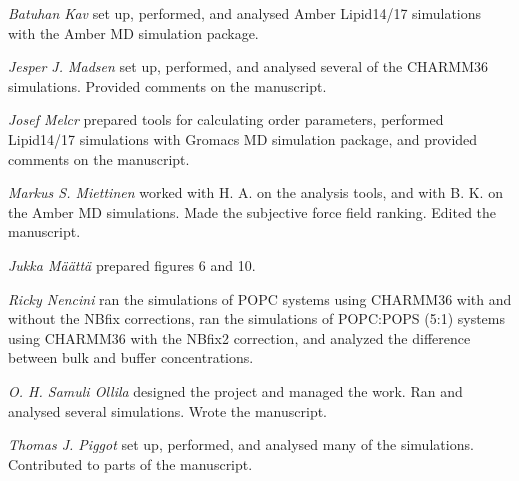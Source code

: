 \documentclass[journal=jpcbfk,manuscript=article]{achemso}
\begin{document}
\noindent
{\it Batuhan Kav}
set up, performed, and analysed Amber Lipid14/17 simulations with the Amber MD simulation package.

\noindent
{\it Jesper J. Madsen}
set up, performed, and analysed several of the CHARMM36 simulations. Provided comments on the manuscript.

\noindent
{\it Josef Melcr}
prepared tools for calculating order parameters, performed Lipid14/17 simulations with Gromacs MD simulation package,
and provided comments on the manuscript.

\noindent
{\it Markus S. Miettinen}
worked with
H. A. on the analysis tools, and with
B. K. on the Amber MD simulations.
Made the subjective force field ranking.
Edited the manuscript.

\noindent
{\it Jukka M{\"a}{\"a}tt{\"a}}
prepared figures 6 and 10.

\noindent
{\it Ricky Nencini}
ran the simulations of POPC systems using CHARMM36 with and without the NBfix corrections,
ran the simulations of POPC:POPS (5:1) systems using CHARMM36 with the NBfix2 correction,
and analyzed the difference between bulk and buffer concentrations. 


\noindent
{\it O. H. Samuli Ollila}
designed the project and managed the work.
Ran and analysed several simulations. Wrote the manuscript.

\noindent
{\it Thomas J. Piggot}
set up, performed, and analysed many of the simulations. Contributed to parts of the manuscript.

\clearpage

\end{document}
